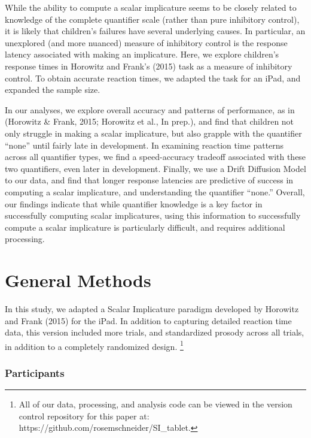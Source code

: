 \documentclass[10pt, letterpaper]{article}
\begin{document}
While the ability to compute a scalar implicature seems to be closely
related to knowledge of the complete quantifier scale (rather than pure
inhibitory control), it is likely that children's failures have several
underlying causes. In particular, an unexplored (and more nuanced)
measure of inhibitory control is the response latency associated with
making an implicature. Here, we explore children's response times in
Horowitz and Frank's (2015) task as a measure of inhibitory control. To
obtain accurate reaction times, we adapted the task for an iPad, and
expanded the sample size.

In our analyses, we explore overall accuracy and patterns of
performance, as in (Horowitz \& Frank, 2015; Horowitz et al., In prep.),
and find that children not only struggle in making a scalar implicature,
but also grapple with the quantifier ``none'' until fairly late in
development. In examining reaction time patterns across all quantifier
types, we find a speed-accuracy tradeoff associated with these two
quantifiers, even later in development. Finally, we use a Drift
Diffusion Model to our data, and find that longer response latencies are
predictive of success in computing a scalar implicature, and
understanding the quantifier ``none.'' Overall, our findings indicate
that while quantifier knowledge is a key factor in successfully
computing scalar implicatures, using this information to successfully
compute a scalar implicature is particularly difficult, and requires
additional processing.

\section{General Methods}\label{general-methods}

In this study, we adapted a Scalar Implicature paradigm developed by
Horowitz and Frank (2015) for the iPad. In addition to capturing
detailed reaction time data, this version included more trials, and
standardized prosody across all trials, in addition to a completely
randomized design.
\footnote{All of our data, processing, and analysis code can be viewed in the version control repository for this paper at: https://github.com/rosemschneider/SI\_tablet.}

\subsubsection{Participants}\label{participants}
\end{document}

